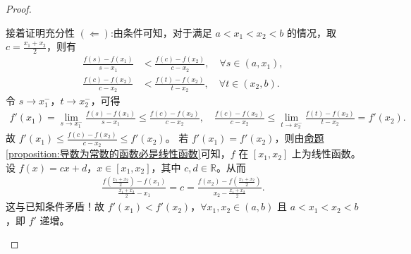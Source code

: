 \documentclass[lang=cn,newtx,10pt,scheme=chinese]{elegantbook}
\begin{document}
\begin{proof}
\begin{enumerate}[(1)]
接着证明充分性 $(\Leftarrow)$:由条件可知，对于满足 \(a < x_1 < x_2 < b\) 的情况，取 \(c = \frac{x_1 + x_2}{2}\)，则有
\begin{align*}
\frac{f(s) - f(x_1)}{s - x_1} &< \frac{f(c) - f(x_2)}{c - x_2}, \quad \forall s \in (a, x_1), \\
\frac{f(c) - f(x_2)}{c - x_2} &< \frac{f(t) - f(x_2)}{t - x_2}, \quad \forall t \in (x_2, b).
\end{align*}
令 \(s \to x_1^-\)，\(t \to x_2^-\)，可得
\begin{align*}
f'(x_1) = \lim_{s \to x_1^-} \frac{f(s) - f(x_1)}{s - x_1} \leqslant \frac{f(c) - f(x_2)}{c - x_2}, \quad
\frac{f(c) - f(x_2)}{c - x_2} \leqslant \lim_{t \to x_2^-} \frac{f(t) - f(x_2)}{t - x_2} = f'(x_2).
\end{align*}
故 \(f'(x_1) \leqslant \frac{f(c) - f(x_2)}{c - x_2} \leqslant f'(x_2)\)。
若 \(f'(x_1) = f'(x_2)\)，则由\hyperref[proposition:导数为常数的函数必是线性函数]{命题\ref{proposition:导数为常数的函数必是线性函数}}可知，\(f\) 在 \([x_1, x_2]\) 上为线性函数。设 \(f(x) = cx + d\)，\(x \in [x_1, x_2]\)，其中 \(c, d \in \mathbb{R}\)。从而
\begin{align*}
\frac{f\left(\frac{x_1 + x_2}{2}\right) - f(x_1)}{\frac{x_1 + x_2}{2} - x_1} = c = \frac{f(x_2) - f\left(\frac{x_1 + x_2}{2}\right)}{x_2 - \frac{x_1 + x_2}{2}}.
\end{align*}
这与已知条件矛盾！故 \(f'(x_1) < f'(x_2)\)，\(\forall x_1, x_2 \in (a, b)\) 且 \(a < x_1 < x_2 < b\)，即 \(f'\) 递增。   
\end{enumerate}
\end{proof}
\end{document}
